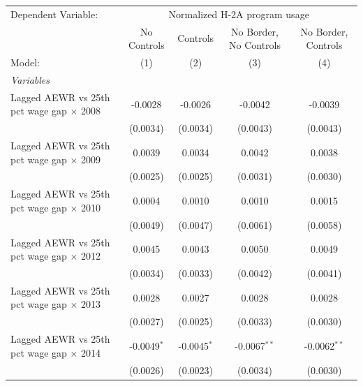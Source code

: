 
\begingroup
\centering
\begin{tabular}{lcccc}
   \tabularnewline \midrule \midrule
   Dependent Variable: & \multicolumn{4}{c}{Normalized H-2A program usage}\\
                                                   & No Controls     & Controls        & No Border, No Controls & No Border, Controls \\   
   Model:                                          & (1)             & (2)             & (3)                    & (4)\\  
   \midrule
   \emph{Variables}\\
   Lagged AEWR vs 25th pct wage gap $\times$ 2008  & -0.0028         & -0.0026         & -0.0042                & -0.0039\\   
                                                   & (0.0034)        & (0.0034)        & (0.0043)               & (0.0043)\\   
   Lagged AEWR vs 25th pct wage gap $\times$ 2009  & 0.0039          & 0.0034          & 0.0042                 & 0.0038\\   
                                                   & (0.0025)        & (0.0025)        & (0.0031)               & (0.0030)\\   
   Lagged AEWR vs 25th pct wage gap $\times$ 2010  & 0.0004          & 0.0010          & 0.0010                 & 0.0015\\   
                                                   & (0.0049)        & (0.0047)        & (0.0061)               & (0.0058)\\   
   Lagged AEWR vs 25th pct wage gap $\times$ 2012  & 0.0045          & 0.0043          & 0.0050                 & 0.0049\\   
                                                   & (0.0034)        & (0.0033)        & (0.0042)               & (0.0041)\\   
   Lagged AEWR vs 25th pct wage gap $\times$ 2013  & 0.0028          & 0.0027          & 0.0028                 & 0.0028\\   
                                                   & (0.0027)        & (0.0025)        & (0.0033)               & (0.0030)\\   
   Lagged AEWR vs 25th pct wage gap $\times$ 2014  & -0.0049$^{*}$   & -0.0045$^{*}$   & -0.0067$^{**}$         & -0.0062$^{**}$\\   
                                                   & (0.0026)        & (0.0023)        & (0.0034)               & (0.0030)\\   

\end{tabular}
